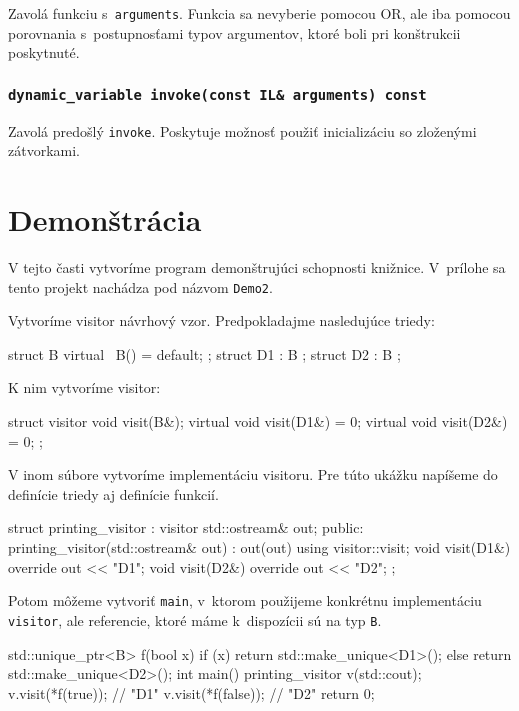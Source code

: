 Zavolá funkciu s~\texttt{arguments}. Funkcia sa nevyberie pomocou OR, ale iba pomocou porovnania s~postupnosťami typov argumentov, ktoré boli pri konštrukcii poskytnuté.

\subsubsection{\texttt{dynamic\_variable invoke(const IL\& arguments) const}}

Zavolá predošlý \texttt{invoke}. Poskytuje možnosť použiť inicializáciu so zloženými zátvorkami.

\section{Demonštrácia}

V tejto časti vytvoríme program demonštrujúci schopnosti knižnice. V~prílohe sa tento projekt nachádza pod názvom \texttt{Demo2}.

Vytvoríme  visitor návrhový vzor. Predpokladajme nasledujúce triedy:
\begin{code}
struct B { virtual ~B() = default; };
struct D1 : B {};
struct D2 : B {};
\end{code}

K nim vytvoríme visitor:
\begin{code}
struct visitor
{   void visit(B&);
    virtual void visit(D1&) = 0;
    virtual void visit(D2&) = 0; };
\end{code}

V inom súbore vytvoríme implementáciu visitoru. Pre túto ukážku napíšeme do definície triedy aj definície funkcií.
\begin{code}
struct printing_visitor : visitor
{   std::ostream& out;
public:
    printing_visitor(std::ostream& out) : out(out) {}
    using visitor::visit;
    void visit(D1&) override { out << "D1"; }
    void visit(D2&) override { out << "D2"; } };
\end{code}

Potom môžeme vytvoriť \texttt{main}, v~ktorom použijeme konkrétnu implementáciu \texttt{visitor}, ale referencie, ktoré máme k~dispozícii sú na typ \texttt{B}.
\begin{code}
std::unique_ptr<B> f(bool x)
{   if (x) return std::make_unique<D1>();
    else   return std::make_unique<D2>();
}
int main()
{   printing_visitor v(std::cout);
    v.visit(*f(true));  // "D1"
    v.visit(*f(false)); // "D2"
    return 0;
}
\end{code}

